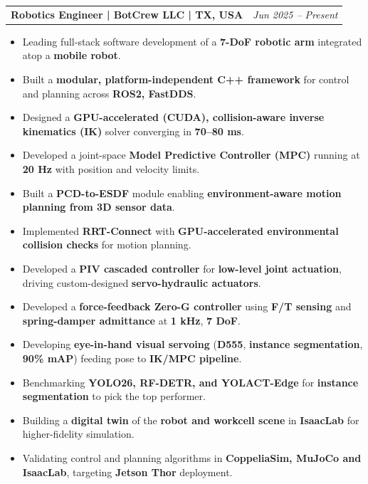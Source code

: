 \documentclass[a4paper,11pt]{article}
\makeatletter
\newcommand{\resumeExp}[2]{
\vspace{0mm}\item[]
    \begin{tabular*}{\textwidth}[t]{l@{\extracolsep{\fill}}r}
        \hspace{-4.4mm} \small\textbf{#1} & {\footnotesize{#2}} \vspace{-1.2mm} %
    \end{tabular*}
    \vspace*{-7mm}
}
\newcommand{\resumeItemListStart}{\begin{justify}\begin{itemize}[leftmargin=1.5ex, rightmargin=2ex, noitemsep,labelsep=1.2mm,itemsep=1mm]\small}
\newcommand{\resumeItemListEnd}{\end{itemize}\end{justify}}%
\makeatother
\begin{document}
\resumeExp
{Robotics Engineer\textnormal{ | BotCrew LLC | TX, USA}}
{\textit{Jun 2025 – Present}}
\resumeItemListStart
\item[$\bullet$] Leading full-stack software development of a \textbf{7-DoF robotic arm} integrated atop a \textbf{mobile robot}.
\item[$\bullet$] Built a \textbf{modular, platform-independent C++ framework} for control and planning across \textbf{ROS2, FastDDS}.
\item[$\bullet$] Designed a \textbf{GPU-accelerated (CUDA), collision-aware inverse kinematics (IK)} solver converging in \textbf{70–80 ms}.
\item[$\bullet$] Developed a joint-space \textbf{Model Predictive Controller (MPC)} running at \textbf{20 Hz} with position and velocity limits.
\item[$\bullet$] Built a \textbf{PCD-to-ESDF} module enabling \textbf{environment-aware motion planning from 3D sensor data}.
\item[$\bullet$] Implemented \textbf{RRT-Connect} with \textbf{GPU-accelerated environmental collision checks} for motion planning.
\item[$\bullet$] Developed a \textbf{PIV cascaded controller} for \textbf{low-level joint actuation}, driving custom-designed \textbf{servo-hydraulic actuators}.
\item[$\bullet$] Developed a \textbf{force-feedback Zero-G controller} using \textbf{F/T sensing} and \textbf{spring-damper admittance} at \textbf{1 kHz}, \textbf{7 DoF}.
\item[$\bullet$] Developing \textbf{eye-in-hand visual servoing} (\textbf{D555}, \textbf{instance segmentation}, \textbf{90\% mAP}) feeding pose to \textbf{IK/MPC pipeline}.
\item[$\bullet$] Benchmarking \textbf{YOLO26, RF-DETR, and YOLACT-Edge} for \textbf{instance segmentation} to pick the top performer.
\item[$\bullet$] Building a \textbf{digital twin} of the \textbf{robot and workcell scene} in \textbf{IsaacLab} for higher-fidelity simulation.
\item[$\bullet$] Validating control and planning algorithms in \textbf{CoppeliaSim, MuJoCo and IsaacLab}, targeting \textbf{Jetson Thor} deployment.
\resumeItemListEnd
\end{document}
